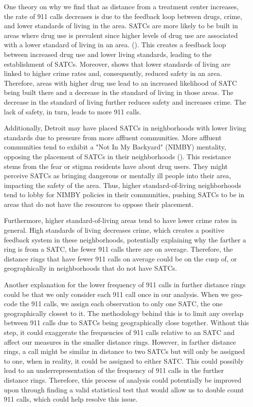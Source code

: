 \documentclass[12pt]{article}
\begin{document}
One theory on why we find that as distance from a treatment center increases, the rate of 911 calls decreases is due to the feedback loop between drugs, crime, and lower standards of living in the area. SATCs are more likely to be built in areas where drug use is prevalent since higher levels of drug use are associated with a lower standard of living in an area. (\cite{drugs_and_crime}). This creates a feedback loop between increased drug use and lower living standards, leading to the establishment of SATCs. Moreover, \cite{drugs_and_crime} shows that lower standards of living are linked to higher crime rates and, consequently, reduced safety in an area. Therefore, areas with higher drug use lead to an increased likelihood of SATC being built there and a decrease in the standard of living in those areas. The decrease in the standard of living further reduces safety and increases crime. The lack of safety, in turn, leads to more 911 calls.  

Additionally, Detroit may have placed SATCs in neighborhoods with lower living standards due to pressure from more affluent communities. More affluent communities tend to exhibit a "Not In My Backyard" (NIMBY) mentality, opposing the placement of SATCs in their neighborhoods (\citealp{NIMBY}). This resistance stems from the fear or stigma residents have about drug users. They might perceive SATCs as bringing dangerous or mentally ill people into their area, impacting the safety of the area. Thus, higher standard-of-living neighborhoods tend to lobby for NIMBY policies in their communities, pushing SATCs to be in areas that do not have the resources to oppose their placement.

Furthermore, higher standard-of-living areas tend to have lower crime rates in general. High standards of living decreases crime, which creates a positive feedback system in these neighborhoods, potentially explaining why the farther a ring is from a SATC, the fewer 911 calls there are on average. Therefore, the distance rings that have fewer 911 calls on average could be on the cusp of, or geographically in neighborhoods that do not have SATCs. 
    
Another explanation for the lower frequency of 911 calls in further distance rings could be that we only consider each 911 call once in our analysis. When we geo-code the 911 calls, we assign each observation to only one SATC, the one geographically closest to it. The methodology behind this is to limit any overlap between 911 calls due to SATCs being geographically close together. Without this step, it could exaggerate the frequencies of 911 calls relative to an SATC and affect our measures in the smaller distance rings.  However, in farther distance rings, a call might be similar in distance to two SATCs but will only be assigned to one, when in reality, it could be assigned to either SATC. This could possibly lead to an underrepresentation of the frequency of 911 calls in the further distance rings. Therefore, this process of analysis could potentially be improved upon through finding a valid statistical test that would allow us to double count 911 calls, which could help resolve this issue. 
\end{document}
